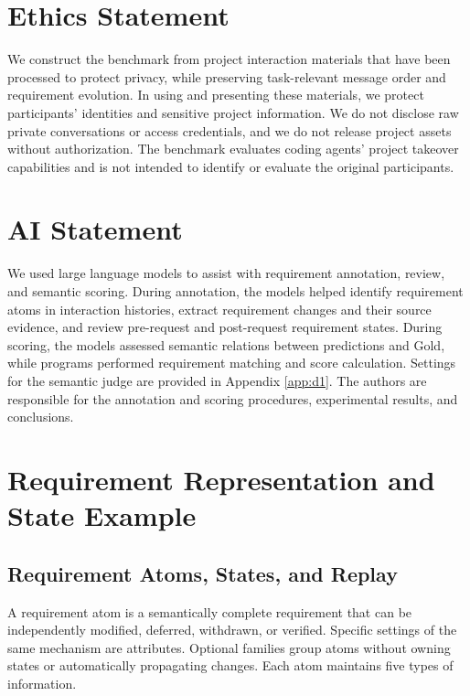 \documentclass{article} %
\newcommand{\appendixfloatlayout}{%
  \setlength{\textfloatsep}{2\baselineskip}%
  \setlength{\floatsep}{2\baselineskip}%
  \setlength{\intextsep}{2\baselineskip}%
  \setlength{\belowcaptionskip}{6pt}%
  \renewcommand{\floatpagefraction}{0.5}%
  \setcounter{topnumber}{2}%
  \setcounter{totalnumber}{3}%
}
\begin{document}
\FloatBarrier
\section*{Ethics Statement}

We construct the benchmark from project interaction materials that have been processed to protect privacy, while preserving task-relevant message order and requirement evolution. In using and presenting these materials, we protect participants' identities and sensitive project information. We do not disclose raw private conversations or access credentials, and we do not release project assets without authorization. The benchmark evaluates coding agents' project takeover capabilities and is not intended to identify or evaluate the original participants.

\FloatBarrier
\section*{AI Statement}

We used large language models to assist with requirement annotation, review, and semantic scoring. During annotation, the models helped identify requirement atoms in interaction histories, extract requirement changes and their source evidence, and review pre-request and post-request requirement states. During scoring, the models assessed semantic relations between predictions and Gold, while programs performed requirement matching and score calculation. Settings for the semantic judge are provided in Appendix \ref{app:d1}. The authors are responsible for the annotation and scoring procedures, experimental results, and conclusions.

\FloatBarrier


\clearpage

\appendixfloatlayout
\appendix

\FloatBarrier
\section{Requirement Representation and State Example}
\label{app:a}

\FloatBarrier
\subsection{Requirement Atoms, States, and Replay}
\label{app:a1}

A requirement atom is a semantically complete requirement that can be independently modified, deferred, withdrawn, or verified. Specific settings of the same mechanism are attributes. Optional families group atoms without owning states or automatically propagating changes. Each atom maintains five types of information.
\end{document}
